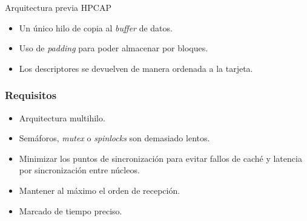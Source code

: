 \documentclass[10pt,notes,compress,usetitleprogressbar,aspectratio=1610]{beamer}
\begin{document}
\begin{frame}{Arquitectura previa HPCAP}

\begin{figure}[hbtp]
\centering

\end{figure}

\begin{itemize}
\item Un único hilo de copia al \textit{buffer} de datos.
\item Uso de \textit{padding} para poder almacenar por bloques. 
\item Los descriptores se devuelven de manera ordenada a la tarjeta.
\end{itemize}

\end{frame}

\begin{frame}
\frametitle{Requisitos}


\begin{itemize}
\item Arquitectura multihilo.
\item Semáforos, \textit{mutex} o \textit{spinlocks} son demasiado lentos.
\item Minimizar los puntos de sincronización para evitar fallos de caché y latencia por sincronización entre núcleos.
\item Mantener al máximo el orden de recepción.
\item Marcado de tiempo preciso.
\end{itemize}
\end{frame}
\end{document}
